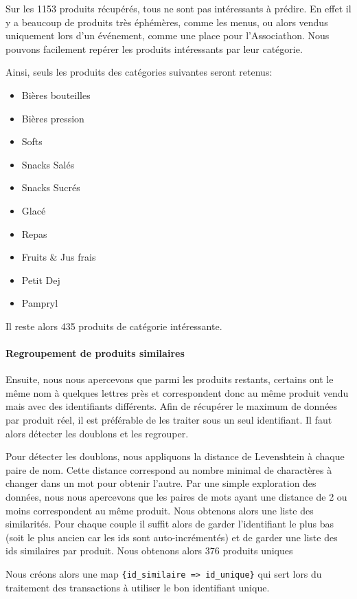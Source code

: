 Sur les 1153 produits récupérés, tous ne sont pas intéressants à prédire. En effet il y a beaucoup de produits très éphémères, comme les menus, ou alors vendus uniquement lors d'un événement, comme une place pour l'Associathon. Nous pouvons facilement repérer les produits intéressants par leur catégorie. 

Ainsi, seuls les produits des catégories suivantes seront retenus:
\begin{itemize}[nolistsep]
    \item Bières bouteilles
    \item Bières pression
    \item Softs
    \item Snacks Salés
    \item Snacks Sucrés
    \item Glacé
    \item Repas
    \item Fruits \& Jus frais
    \item Petit Dej
    \item Pampryl
\end{itemize}
Il reste alors 435 produits de catégorie intéressante.

\paragraph{Regroupement de produits similaires}
\label{par:similar_products}

Ensuite, nous nous apercevons que parmi les produits restants, certains ont le même nom à quelques lettres près et correspondent donc au même produit vendu mais avec des identifiants différents. Afin de récupérer le maximum de données par produit réel, il est préférable de les traiter sous un seul identifiant. Il faut alors détecter les doublons et les regrouper.

Pour détecter les doublons, nous appliquons la distance de Levenshtein à chaque paire de nom. Cette distance correspond au nombre minimal de charactères à changer dans un mot pour obtenir l'autre. Par une simple exploration des données, nous nous apercevons que les paires de mots ayant une distance de 2 ou moins correspondent au même produit. Nous obtenons alors une liste des similarités. Pour chaque couple il suffit alors de garder l'identifiant le plus bas (soit le plus ancien car les ids sont auto-incrémentés) et de garder une liste des ids similaires par produit. Nous obtenons alors 376 produits uniques

Nous créons alors une map \texttt{\{id\_similaire => id\_unique\}} qui sert lors du traitement des transactions à utiliser le bon identifiant unique.

